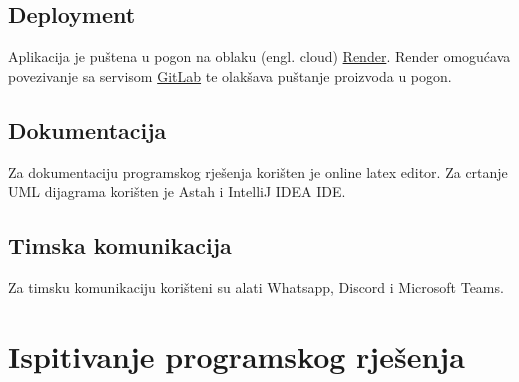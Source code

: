             \subsection{Deployment}
            Aplikacija je puštena u pogon na oblaku (engl. cloud) \href{https://render.com}{Render}. Render omogućava povezivanje sa servisom \href{https://gitlab.com}{GitLab} te olakšava puštanje proizvoda u pogon.

            \subsection{Dokumentacija} 
            Za dokumentaciju programskog rješenja korišten je online latex editor. Za crtanje UML dijagrama korišten je Astah i IntelliJ IDEA IDE.

            \subsection{Timska komunikacija} 
            Za timsku komunikaciju korišteni su alati Whatsapp, Discord i Microsoft Teams. 
            
		\section{Ispitivanje programskog rješenja}
			
